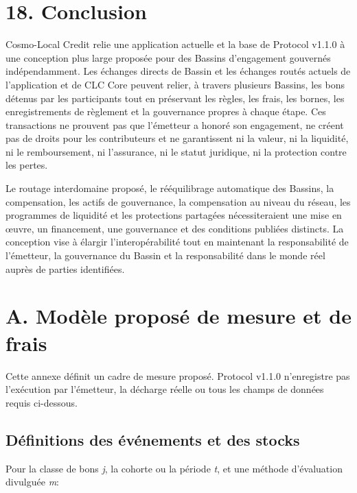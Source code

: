 \documentclass[11pt]{article}
\begin{document}
\section*{18. Conclusion}

Cosmo-Local Credit relie une application actuelle et la base de Protocol v1.1.0 à une conception plus large proposée pour des Bassins d'engagement gouvernés indépendamment. Les échanges directs de Bassin et les échanges routés actuels de l'application et de CLC Core peuvent relier, à travers plusieurs Bassins, les bons détenus par les participants tout en préservant les règles, les frais, les bornes, les enregistrements de règlement et la gouvernance propres à chaque étape. Ces transactions ne prouvent pas que l'émetteur a honoré son engagement, ne créent pas de droits pour les contributeurs et ne garantissent ni la valeur, ni la liquidité, ni le remboursement, ni l'assurance, ni le statut juridique, ni la protection contre les pertes.

Le routage interdomaine proposé, le rééquilibrage automatique des Bassins, la compensation, les actifs de gouvernance, la compensation au niveau du réseau, les programmes de liquidité et les protections partagées nécessiteraient une mise en œuvre, un financement, une gouvernance et des conditions publiées distincts. La conception vise à élargir l'interopérabilité tout en maintenant la responsabilité de l'émetteur, la gouvernance du Bassin et la responsabilité dans le monde réel auprès de parties identifiées.


\section*{A. Modèle proposé de mesure et de frais}

Cette annexe définit un cadre de mesure proposé. Protocol v1.1.0 n'enregistre pas l'exécution par l'émetteur, la décharge réelle ou tous les champs de données requis ci-dessous.

\subsection*{Définitions des événements et des stocks}

Pour la classe de bons \emph{j}, la cohorte ou la période \emph{t}, et une méthode d'évaluation divulguée \emph{m}:
\end{document}
